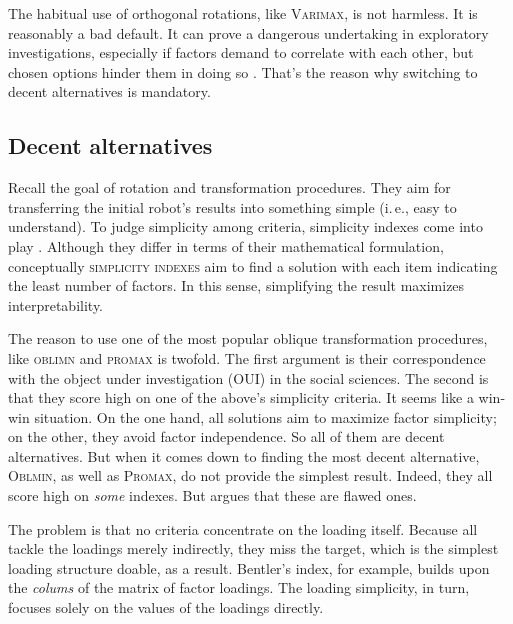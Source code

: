 \documentclass[jou, 11pt]{apa7}
\begin{document}
The habitual use of orthogonal rotations, like \textsc{Varimax}, is not
harmless. It is reasonably a bad default. It can prove a dangerous undertaking
in exploratory investigations, especially if factors demand to correlate with
each other, but chosen options hinder them in doing so \parencite{Loo1979}.
That’s the reason why switching to decent alternatives is mandatory.

\subsection{Decent alternatives}

Recall the goal of rotation and transformation procedures. They aim for
transferring the initial robot's results into something simple (i.\,e., easy to
understand). To judge simplicity among criteria, simplicity indexes come into
play \parencite[see, e.\,g.][]{Bentler1977, Kaiser1974, Lorenzo-Seva2003}.
Although they differ in terms of their mathematical formulation, conceptually
\textsc{simplicity indexes} aim to find a solution with each item indicating
the least number of factors. In this sense, simplifying the result maximizes
interpretability.

The reason to use one of the most popular oblique transformation procedures,
like \textsc{oblimn} and \textsc{promax} \parencite{Hendrickson1964} is
twofold. The first argument is their correspondence with the object under
investigation (OUI) in the social sciences. The second is that they score high
on one of the above's simplicity criteria. It seems like a win-win situation.
On the one hand, all solutions aim to maximize factor simplicity; on the other,
they avoid factor independence. So all of them are decent alternatives. But
when it comes down to finding the most decent alternative, \textsc{Oblmin}, as
well as \textsc{Promax}, do not provide the simplest result. Indeed, they all
score high on \textit{some} indexes. But \textcite{Lorenzo-Seva2003} argues
that these are flawed ones. 

The problem is that no criteria concentrate on the loading itself. Because all
tackle the loadings merely indirectly, they miss the target, which is the
simplest loading structure doable, as a result. Bentler’s index, for example,
builds upon the \textit{colums} of the matrix of factor loadings. The loading
simplicity, in turn, focuses solely on the values of the loadings directly.
\end{document}
